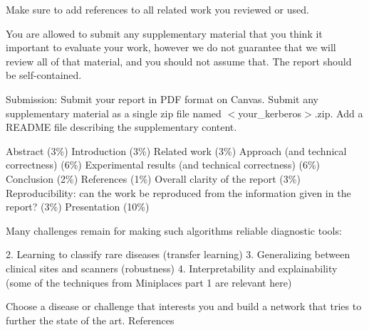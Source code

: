 \documentclass[10pt,twocolumn,letterpaper]{article}
\begin{document}
Make sure to add references to all related work you reviewed or used.

You are allowed to submit any supplementary material that you think it important to evaluate your work, however we do not guarantee that we will review all of that material, and you should not assume that. The report should be self-contained.

Submission: Submit your report in PDF format on Canvas. Submit any supplementary material as a single zip file named $<$your\_kerberos$>$.zip. Add a README file describing the supplementary content.

Abstract (3\%)
Introduction (3\%)
Related work (3\%)
Approach (and technical correctness) (6\%)
Experimental results (and technical correctness) (6\%)
Conclusion (2\%)
References (1\%)
Overall clarity of the report (3\%)
Reproducibility: can the work be reproduced from the information given in the report? (3\%)
Presentation (10\%)

Many challenges remain for making such algorithms reliable diagnostic
tools:

2. Learning to classify rare diseases (transfer learning)
3. Generalizing between clinical sites and scanners (robustness)
4. Interpretability and explainability (some of the techniques from Miniplaces part 1 are relevant
here)

Choose a disease or challenge that interests you and build a network that tries to further the
state of the art.
References



{\small
%


}
\end{document}
